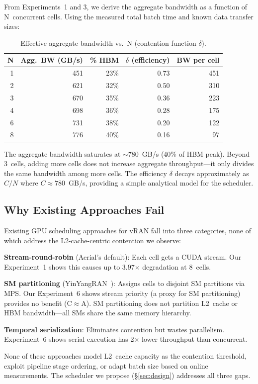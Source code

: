 From Experiments~1 and 3, we derive the aggregate bandwidth as a function of N~concurrent cells. Using the measured total batch time and known data transfer sizes:

\begin{table}[h]
\centering
\small
\caption{Effective aggregate bandwidth vs.\ N (contention function $\delta$).}
\label{tab:bw_fn}
\begin{tabular}{@{}rrrrr@{}}
\toprule
N & Agg.\ BW (GB/s) & \% HBM & $\delta$ (efficiency) & BW per cell \\
\midrule
1 & 451 & 23\% & 0.73 & 451 \\
2 & 621 & 32\% & 0.50 & 310 \\
3 & 670 & 35\% & 0.36 & 223 \\
4 & 698 & 36\% & 0.28 & 175 \\
6 & 731 & 38\% & 0.20 & 122 \\
8 & 776 & 40\% & 0.16 & 97 \\
\bottomrule
\end{tabular}
\end{table}

The aggregate bandwidth saturates at $\sim$780~GB/s (40\% of HBM peak). Beyond 3~cells, adding more cells does not increase aggregate throughput---it only divides the same bandwidth among more cells. The efficiency $\delta$ decays approximately as $C/N$ where $C \approx 780$~GB/s, providing a simple analytical model for the scheduler.

\subsection{Why Existing Approaches Fail}

Existing GPU scheduling approaches for vRAN fall into three categories, none of which address the L2-cache-centric contention we observe:

\textbf{Stream-round-robin} (Aerial's default): Each cell gets a CUDA stream. Our Experiment~1 shows this causes up to 3.97$\times$ degradation at 8~cells.

\textbf{SM partitioning} (YinYangRAN~\cite{yinyangran}): Assigns cells to disjoint SM partitions via MPS. Our Experiment~6 shows stream priority (a proxy for SM partitioning) provides no benefit (C$\approx$A). SM partitioning does not partition L2~cache or HBM bandwidth---all SMs share the same memory hierarchy.

\textbf{Temporal serialization}: Eliminates contention but wastes parallelism. Experiment~6 shows serial execution has 2$\times$ lower throughput than concurrent.

None of these approaches model L2~cache capacity as the contention threshold, exploit pipeline stage ordering, or adapt batch size based on online measurements. The scheduler we propose (\S\ref{sec:design}) addresses all three gaps.

